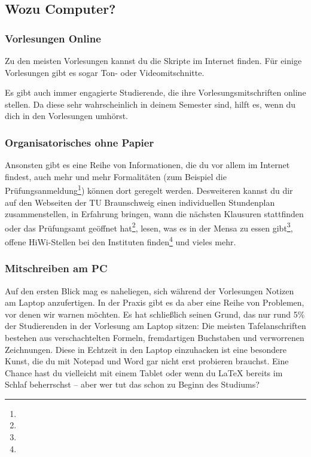 
	\subsection{Wozu Computer?}
		\subsubsection{Vorlesungen Online}
			Zu den meisten Vorlesungen kannst du die Skripte im Internet finden. Für einige Vorlesungen gibt es sogar Ton- oder Videomitschnitte.

			Es gibt auch immer engagierte Studierende, die ihre Vorlesungsmitschriften online stellen. Da diese sehr wahrscheinlich in deinem Semester sind, hilft es, wenn du dich in den Vorlesungen umhörst.

		\subsubsection{Organisatorisches ohne Papier}
			Ansonsten gibt es eine Reihe von Informationen, die du vor allem im Internet findest, auch mehr und mehr Formalitäten (zum Beispiel die Prüfungsanmeldung\footnote{}) können dort geregelt werden. Desweiteren kannst du dir auf den Webseiten der TU Braunschweig einen individuellen Stundenplan zusammenstellen, in Erfahrung bringen, wann die nächsten Klausuren stattfinden oder das Prüfungsamt geöffnet hat\footnote{}, lesen, was es in der Mensa zu essen gibt\footnote{}, offene HiWi-Stellen bei den Instituten finden\footnote{} und vieles mehr.

		\subsubsection{Mitschreiben am PC}
			Auf den ersten Blick mag es naheliegen, sich während der Vorlesungen Notizen am Laptop anzufertigen. In der Praxis gibt es da aber eine Reihe von Problemen, vor denen wir  warnen möchten. Es hat schließlich seinen Grund, das nur rund 5\% der Studierenden in der Vorlesung am Laptop sitzen: Die meisten Tafelanschriften bestehen  aus verschachtelten Formeln, fremdartigen Buchstaben und verworrenen Zeichnungen. Diese in Echtzeit in den Laptop einzuhacken ist eine besondere Kunst, die du mit Notepad und Word gar nicht erst probieren brauchst. Eine Chance hast du vielleicht mit einem Tablet oder wenn du \LaTeX{} bereits im Schlaf beherrschst -- aber wer tut das schon zu Beginn des Studiums?

